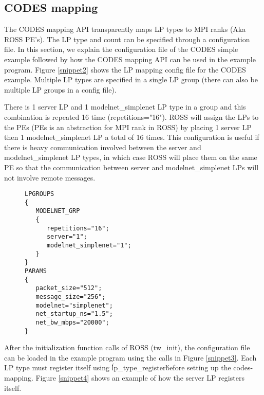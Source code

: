 \documentclass[conference,10pt,compsocconf,onecolumn]{IEEEtran}
\begin{document}
\subsection{CODES mapping}
The CODES mapping API transparently maps LP types to MPI ranks (Aka ROSS PE's). The
LP type and count can be specified through a configuration file. In this section, we
explain the configuration file of the CODES simple example followed by how the
CODES mapping API can be used in the example program. Figure \ref{snippet2}
shows the LP mapping config file for the CODES example. Multiple LP types are
specified in a single LP group (there can also be multiple LP groups in a config file).

There is 1 server LP and 1 modelnet\_simplenet LP type in a group and this
combination is repeated 16 time (repetitions="16"). ROSS will assign the LPs to
the PEs (PEs is an abstraction for MPI rank in ROSS) by placing 1 server LP
then 1 modelnet\_simplenet LP a total of 16 times. This configuration is useful
if there is heavy communication involved between the server and
modelnet\_simplenet LP types, in which case ROSS will place them on the same PE
so that the communication between server and modelnet\_simplenet LPs will not involve remote
messages.

\begin{figure}
\begin{lstlisting}[caption=example configuration file for CODES LP mapping, label=snippet2]
LPGROUPS
{
   MODELNET_GRP
   {
      repetitions="16";
      server="1";
      modelnet_simplenet="1";
   }
}
PARAMS
{
   packet_size="512";
   message_size="256";
   modelnet="simplenet";
   net_startup_ns="1.5";
   net_bw_mbps="20000";
}
\end{lstlisting}
\end{figure} 

After the initialization function calls of ROSS (tw\_init), the configuration
file can be loaded in the example program using the calls in Figure
\ref{snippet3}. Each LP type must register itself using \'lp\_type\_register\'
before setting up the codes-mapping. Figure \ref{snippet4} shows an example of how
the server LP registers itself. 
\end{document}
